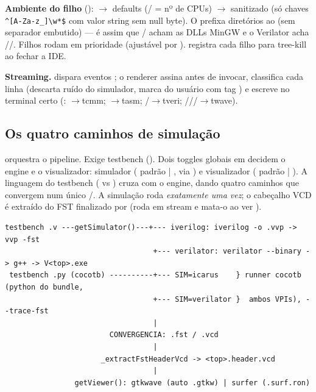 \textbf{Ambiente do filho} ():  $\to$ defaults (/ = nº de CPUs) $\to$  sanitizado (só chaves \lstinline|^[A-Za-z_]\w*$| com valor string sem null byte). O  prefixa diretórios ao  (sem separador embutido) --- é assim que / acham as DLLs MinGW e o Verilator acha //. Filhos rodam em prioridade  (ajustável por ).  registra cada filho para tree-kill ao fechar a IDE.

\textbf{Streaming.}  dispara eventos ; o renderer assina  antes de invocar, classifica cada linha (descarta ruído do simulador, marca  do usuário com tag ) e escreve no terminal certo (: $\to$tcmm; $\to$tasm; /$\to$tveri; ///$\to$twave).

\subsection{Os quatro caminhos de simulação}

 orquestra o pipeline. Exige testbench (). Dois toggles globais em  decidem o engine e o visualizador: simulador  ( padrão | , via ) e visualizador  ( padrão | ). A linguagem do testbench ( vs ) cruza com o engine, dando quatro caminhos que convergem num único /. A simulação roda \emph{exatamente uma vez}; o cabeçalho VCD é extraído do FST finalizado por  (roda  em stream e mata-o ao ver ).

\begin{lstlisting}[basicstyle=\ttfamily\scriptsize]
 testbench .v ---getSimulator()---+--- iverilog: iverilog -o .vvp -> vvp -fst
                                  +--- verilator: verilator --binary -> g++ -> V<top>.exe
 testbench .py (cocotb) ----------+--- SIM=icarus    } runner cocotb (python do bundle,
                                  +--- SIM=verilator }  ambos VPIs), --trace-fst
                                  |
                        CONVERGENCIA: .fst / .vcd
                                  |
                      _extractFstHeaderVcd -> <top>.header.vcd
                                  |
                getViewer(): gtkwave (auto .gtkw) | surfer (.surf.ron)
\end{lstlisting}

